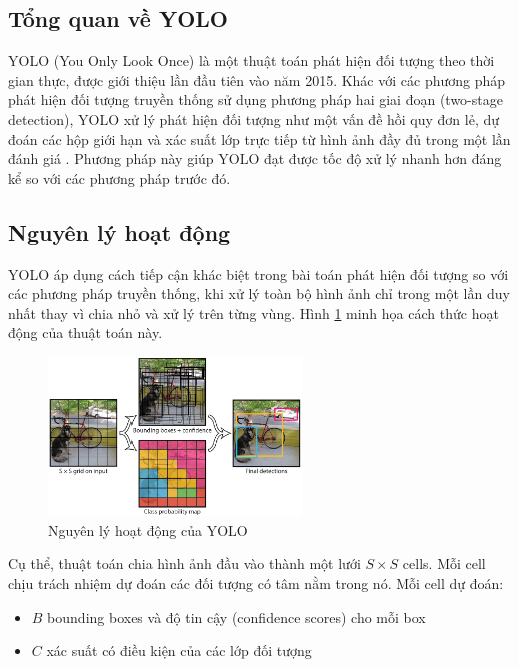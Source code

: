 \subsection{Tổng quan về YOLO}
YOLO (You Only Look Once) là một thuật toán phát hiện đối tượng theo thời gian thực,
được giới thiệu lần đầu tiên vào năm 2015. Khác với các phương pháp phát hiện
đối tượng truyền thống sử dụng phương pháp hai giai đoạn (two-stage detection), YOLO
xử lý phát hiện đối tượng như một vấn đề hồi quy đơn lẻ, dự đoán các hộp giới
hạn và xác suất lớp trực tiếp từ hình ảnh đầy đủ trong một lần đánh giá
\cite{Redmon2016}. Phương pháp này giúp YOLO đạt được tốc độ xử lý nhanh hơn đáng
kể so với các phương pháp trước đó.

\subsection{Nguyên lý hoạt động}
YOLO áp dụng cách tiếp cận khác biệt trong bài toán phát hiện đối tượng so với các phương pháp truyền thống, khi xử lý toàn bộ hình ảnh chỉ trong một lần duy nhất thay vì chia nhỏ và xử lý trên từng vùng. Hình \ref{fig:yolo_architecture} minh họa cách thức hoạt động của thuật toán này.

\begin{figure}[!htp]
    \centering
    \includegraphics[width=0.6\textwidth]{img/yolo_1}
    \caption{Nguyên lý hoạt động của YOLO}
    \label{fig:yolo_architecture}
\end{figure}

Cụ thể, thuật toán chia hình ảnh đầu vào thành một lưới $S \times S$ cells. Mỗi cell chịu
trách nhiệm dự đoán các đối tượng có tâm nằm trong nó. Mỗi cell dự đoán:
\begin{itemize}
    \item $B$ bounding boxes và độ tin cậy (confidence scores) cho mỗi box

    \item $C$ xác suất có điều kiện của các lớp đối tượng
\end{itemize}

